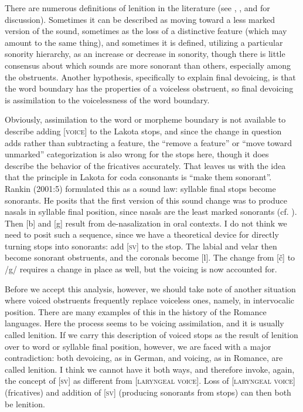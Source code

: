 \documentclass[output=paper]{LSP/langsci}
\begin{document}
There are numerous definitions of lenition in the literature (see \citealt{Honeybone2008}, \citealt{Harris2009}, and \citealt{Szigetvari2008} for discussion). Sometimes it can be described as moving toward a less marked version of the sound, sometimes as the loss of a distinctive feature (which may amount to the same thing), and sometimes it is defined, utilizing a particular sonority hierarchy, as an increase or decrease in sonority, though there is little consensus about which sounds are more sonorant than others, especially among the obstruents. Another hypothesis, specifically to explain final devoicing, is that the word boundary has the properties of a voiceless obstruent, so final devoicing is assimilation to the voicelessness of the word boundary.

Obviously, assimilation to the word or morpheme boundary is not available to describe adding [\textsc{voice}] to the Lakota stops, and since the change in question adds rather than subtracting a feature, the ``remove a feature'' or ``move toward unmarked'' categorization is also wrong for the stops here, though it does describe the behavior of the fricatives accurately. That leaves us with the idea that the principle in Lakota for coda consonants is ``make them sonorant''. Rankin (2001:5) formulated this as a sound law: syllable final stops become sonorants. He posits that the first version of this sound change was to produce nasals in syllable final position, since nasals are the least marked sonorants (cf. \citealt{Rice1993}). Then [b] and [g] result from de-nasalization in oral contexts. I do not think we need to posit such a sequence, since we have a theoretical device for directly turning stops into sonorants: add [\textsc{sv}] to the stop. The labial and velar then become sonorant obstruents, and the coronals become [l]. The change from [\v{c}] to /g/ requires a change in place as well, but the voicing is now accounted for.

Before we accept this analysis, however, we should take note of another situation where voiced obstruents frequently replace voiceless ones, namely, in intervocalic position. There are many examples of this in the history of the Romance languages. Here the process seems to be voicing assimilation, and it is usually called lenition. If we carry this description of voiced stops as the result of lenition over to word or syllable final position, however, we are faced with a major contradiction: both devoicing, as in German, and voicing, as in Romance, are called lenition. I think we cannot have it both ways, and therefore invoke, again, the concept of [\textsc{sv}] as different from [\textsc{laryngeal voice}]. Loss of [\textsc{laryngeal voice}] (fricatives) and addition of [\textsc{sv}] (producing sonorants from stops) can then both be lenition.
\end{document}

